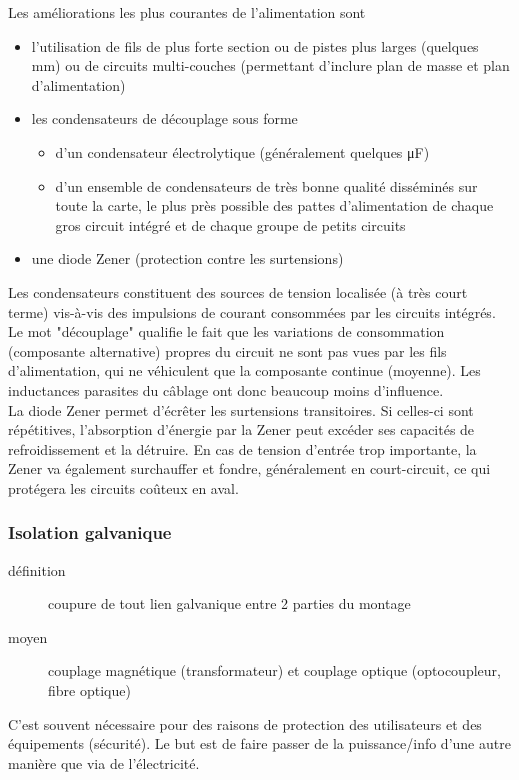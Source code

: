 Les améliorations les plus courantes de l'alimentation sont
\begin{itemize}
\item l'utilisation de fils de plus forte section ou de pistes plus larges (quelques \si{\milli\meter}) ou de circuits multi-couches (permettant d'inclure plan de masse et plan d'alimentation)
\item les condensateurs de découplage sous forme
\begin{itemize}
	\item d'un condensateur électrolytique (généralement quelques \si{\micro\farad}) 
	\item d'un ensemble de condensateurs de très bonne qualité disséminés sur toute la carte, le plus près possible des pattes d'alimentation de chaque gros circuit intégré et de chaque groupe de petits circuits

\end{itemize}
\item une diode Zener (protection contre les surtensions)
\end{itemize}
Les condensateurs constituent des sources de tension localisée (à très court terme) vis-à-vis des impulsions de courant consommées par les circuits intégrés.\\

Le mot "découplage" qualifie le fait que les variations de consommation (composante alternative) propres du circuit ne sont pas vues par les fils d'alimentation, qui ne véhiculent que la composante continue (moyenne). Les inductances parasites du câblage ont donc beaucoup moins d'influence.\\

La diode Zener permet d'écrêter les surtensions transitoires. Si celles-ci sont répétitives, l'absorption d'énergie par la Zener peut excéder ses capacités de refroidissement et la détruire. En cas de tension d'entrée trop importante, la Zener va également surchauffer et fondre, généralement en court-circuit, ce qui protégera les circuits coûteux en aval.
\subsubsection{Isolation galvanique}
\begin{description}
	\item[définition] coupure de tout lien galvanique entre 2 parties du montage
	\item[moyen] couplage magnétique (transformateur) et couplage optique (optocoupleur, fibre optique)
\end{description}
C'est souvent nécessaire pour des raisons de protection des utilisateurs et des équipements (sécurité). Le but est de faire passer de la puissance/info d'une autre manière que via de l'électricité.
